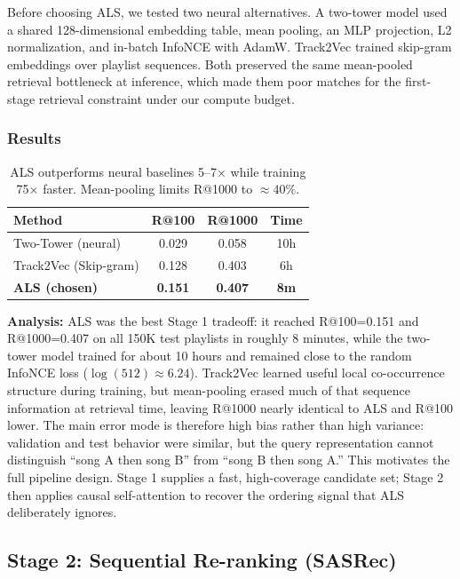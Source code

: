 \documentclass[11pt,a4paper]{article}
\begin{document}
Before choosing ALS, we tested two neural alternatives. A two-tower model used a shared
128-dimensional embedding table, mean pooling, an MLP projection, L2 normalization, and
in-batch InfoNCE with AdamW. Track2Vec trained skip-gram embeddings over playlist
sequences. Both preserved the same mean-pooled retrieval bottleneck at inference, which
made them poor matches for the first-stage retrieval constraint under our compute budget.

\subsubsection{Results}

\begin{table}[H]
\centering
\begin{tabular}{lccc}
\toprule
\textbf{Method} & \textbf{R@100} & \textbf{R@1000} & \textbf{Time} \\
\midrule
Two-Tower (neural) & 0.029 & 0.058 & 10h \\
Track2Vec (Skip-gram) & 0.128 & 0.403 & 6h \\
\textbf{ALS (chosen)} & \textbf{0.151} & \textbf{0.407} & \textbf{8m} \\
\bottomrule
\end{tabular}
\caption{ALS outperforms neural baselines 5--7× while training 75× faster. Mean-pooling limits R@1000 to $\approx 40\%$.}
\end{table}

\textbf{Analysis:} ALS was the best Stage 1 tradeoff: it reached R@100=0.151 and
R@1000=0.407 on all 150K test playlists in roughly 8 minutes, while the two-tower model
trained for about 10 hours and remained close to the random InfoNCE loss
($\log(512)\approx6.24$). Track2Vec learned useful local co-occurrence structure during
training, but mean-pooling erased much of that sequence information at retrieval time,
leaving R@1000 nearly identical to ALS and R@100 lower. The main error mode is therefore
high bias rather than high variance: validation and test behavior were similar, but the
query representation cannot distinguish ``song A then song B'' from ``song B then song
A.'' This motivates the full pipeline design. Stage 1 supplies a fast, high-coverage
candidate set; Stage 2 then applies causal self-attention to recover the ordering signal
that ALS deliberately ignores.

\subsection{Stage 2: Sequential Re-ranking (SASRec)}
\end{document}
